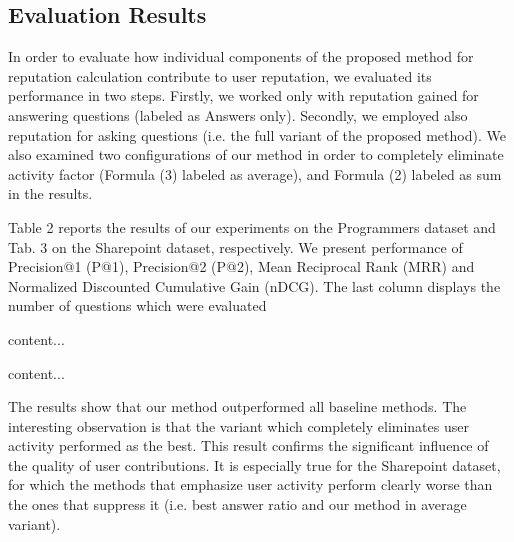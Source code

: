 \documentclass{llncs}
\begin{document}
		\subsection{Evaluation Results}
	
			In order to evaluate how individual components of the proposed method for reputation
			calculation contribute to user reputation, we evaluated its performance
			in two steps. Firstly, we worked only with reputation gained for answering questions
			(labeled as Answers only). Secondly, we employed also reputation for asking
			questions (i.e. the full variant of the proposed method). We also examined two
			configurations of our method in order to completely eliminate activity factor
			(Formula (3) labeled as average), and Formula (2) labeled as sum in the results.

			Table 2 reports the results of our experiments on the Programmers dataset
			and Tab. 3 on the Sharepoint dataset, respectively. We present performance
			of Precision@1 (P@1), Precision@2 (P@2), Mean Reciprocal Rank (MRR) and
			Normalized Discounted Cumulative Gain (nDCG). The last column displays the
			number of questions which were evaluated

		\begin{table}
			content...
		\end{table}
		\begin{table}
			content...
		\end{table}
		
			The results show that our method outperformed all baseline methods. The
			interesting observation is that the variant which completely eliminates user activity
			performed as the best. This result confirms the significant influence of the
			quality of user contributions. It is especially true for the Sharepoint dataset, for
			which the methods that emphasize user activity perform clearly worse than the
			ones that suppress it (i.e. best answer ratio and our method in average variant).
\end{document}
